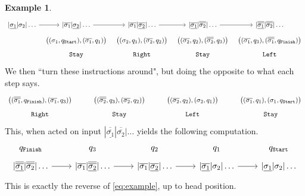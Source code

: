 \documentclass[12pt]{article}
\theoremstyle{plain}
\theoremstyle{definition}
\newtheorem{example}[thm]{Example}
\begin{document}
\begin{example}
\begin{equation*}
\begin{tikzcd}[row sep = tiny, column sep = tiny]
			{|\underline{\sigma_1}|\sigma_2|\ldots}\arrow[r] & {|\overline{\sigma_1}|\underline{\sigma_2}|\ldots}\arrow[r] & {|\overline{\sigma_1}|\underline{\overline{\sigma_2}}|\ldots}\arrow[r] & {|\underline{\overline{\sigma_1}}|\overline{\overline{\sigma_2}}|\ldots}\arrow[r] & {|\underline{\overline{\overline{\sigma_1}}}|\overline{\overline{\sigma_2}}|\ldots}\\
			& {\big((\sigma_1, q_{\texttt{Start}}), (\overline{\sigma_1}, q_1)\big)} & {\big((\sigma_2, q_1), (\overline{\sigma_2}, q_2)\big)} & {\big((\overline{\sigma_2}, q_2), (\overline{\overline{\sigma_2}}, q_3)\big)} & {\big((\overline{\sigma_1}, q_3), (\overline{\overline{\sigma_1}}, q_{\texttt{Finish}})\big)}\\
			& \texttt{Stay} & \texttt{Right} & \texttt{Stay} & \texttt{Left}
		\end{tikzcd}
	\end{equation*}
	We then ``turn these instructions around", but doing the opposite to what each step says.
	\begin{equation}
		\begin{tikzcd}[row sep = tiny, row sep = tiny]
			{\big( (\overline{\overline{\sigma_1}}, q_{\texttt{Finish}}),(\overline{\sigma_1}, q_3)\big)} & {\big( (\overline{\overline{\sigma_2}}, q_3),(\overline{\sigma_2}, q_2)\big)} & {\big( (\overline{\sigma_2}, q_2),(\sigma_2, q_1)\big)} & {\big( (\overline{\sigma_1}, q_1),(\sigma_1, q_{\texttt{Start}})\big)}\\
			\texttt{Right} & \texttt{Stay} & \texttt{Left} & \texttt{Stay}
		\end{tikzcd}
	\end{equation}
	This, when acted on input ${|\underline{\overline{\overline{\sigma_1}}}|\overline{\overline{\sigma_2}}|\ldots}$ yields the following computation.
	\begin{equation}
		\begin{tikzcd}[row sep = tiny]
			{q_{\texttt{Finish}}} & q_3 & q_2 & q_1 & q_{\texttt{Start}}\\
			{|\underline{\overline{\overline{\sigma_1}}}|\overline{\overline{\sigma_2}}|\ldots}\arrow[r] & {|\overline{\sigma_1}|\underline{\overline{\overline{\sigma_2}}}}|\ldots\arrow[r] & {|\overline{\sigma_1}|\underline{\overline{\sigma_2}}|\ldots}\arrow[r] & {|\underline{\overline{\sigma_1}}|\sigma_2|\ldots}\arrow[r] & {|\underline{\sigma_1}|\sigma_2|\ldots}
		\end{tikzcd}
	\end{equation}
	This is exactly the reverse of \eqref{eq:example}, up to head position.
\end{example}
	
\end{document}
